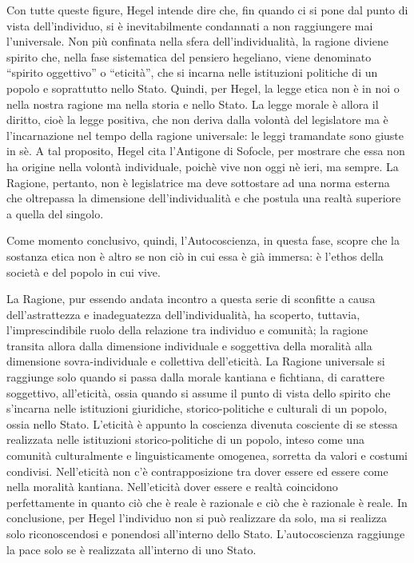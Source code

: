 \documentclass[a4paper,12pt,oneside,openany]{book}%
\begin{document}
Con tutte queste figure, Hegel intende dire che, fin quando ci si pone dal punto di vista dell’individuo, si è inevitabilmente condannati a non raggiungere mai l’universale. Non più confinata nella sfera dell’individualità, la ragione diviene spirito che, nella fase sistematica del pensiero hegeliano, viene denominato “spirito oggettivo” o “eticità”, che si incarna nelle istituzioni politiche di un popolo e soprattutto nello Stato. Quindi, per Hegel, la legge etica non è in noi o nella nostra ragione ma nella storia e nello Stato. La legge morale è allora il diritto, cioè la legge positiva, che non deriva dalla volontà del legislatore ma è l’incarnazione nel tempo della ragione universale: le leggi tramandate sono giuste in sè. A tal proposito, Hegel cita l’Antigone di Sofocle, per mostrare che essa non ha origine nella volontà individuale, poichè vive non oggi nè ieri, ma sempre. La Ragione, pertanto, non è legislatrice ma deve sottostare ad una norma esterna che oltrepassa la dimensione dell’individualità e che postula una realtà superiore a quella del singolo.

Come momento conclusivo, quindi, l’Autocoscienza, in questa fase, scopre che la sostanza etica non è altro se non ciò in cui essa è già immersa: è l’ethos della società e del popolo in cui vive.

La Ragione, pur essendo andata incontro a questa serie di sconfitte a causa dell’astrattezza e inadeguatezza dell’individualità, ha scoperto, tuttavia, l’imprescindibile ruolo della relazione tra individuo e comunità; la ragione transita allora dalla dimensione individuale e soggettiva della moralità alla dimensione sovra-individuale e collettiva dell’eticità. La Ragione universale si raggiunge solo quando si passa dalla morale kantiana e fichtiana, di carattere soggettivo, all’eticità, ossia quando si assume il punto di vista dello spirito che s’incarna nelle istituzioni giuridiche, storico-politiche e culturali di un popolo, ossia nello Stato. L’eticità è appunto la coscienza divenuta cosciente di se stessa realizzata nelle istituzioni storico-politiche di un popolo, inteso come una comunità culturalmente e linguisticamente omogenea, sorretta da valori e costumi condivisi. Nell’eticità non c’è contrapposizione tra dover essere ed essere come nella moralità kantiana. Nell’eticità dover essere e realtà coincidono perfettamente in quanto ciò che è reale è razionale e ciò che è razionale è reale. In conclusione, per Hegel l’individuo non si può realizzare da solo, ma si realizza solo riconoscendosi e ponendosi all’interno dello Stato. L’autocoscienza raggiunge la pace solo se è realizzata all’interno di uno Stato.
\end{document}
